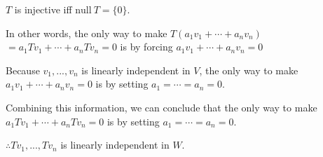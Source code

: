 \documentclass{article}
\begin{document}
\begin{enumerate}[nolistsep]
	$T$ is injective iff $\text{null}\ T = \{0\}$.
	
	In other words, the only way to make $T(a_1v_1 + \cdots + a_nv_n)$\newline$= a_1Tv_1 + \cdots + a_nTv_n = 0$ is by forcing $a_1v_1 + \cdots + a_nv_n = 0$ 
	
	Because $v_1,...,v_n$ is linearly independent in $V$, the only way to make $a_1v_1 + \cdots + a_nv_n = 0$ is by setting $a_1 = \cdots = a_n = 0$.
	
	Combining this information, we can conclude that the only way to make $a_1Tv_1 + \cdots + a_nTv_n = 0$ is by setting $a_1 = \cdots = a_n = 0$.
	
	$\therefore Tv_1,...,Tv_n$ is linearly independent in $W$.		
	\end{enumerate}
\end{document}
